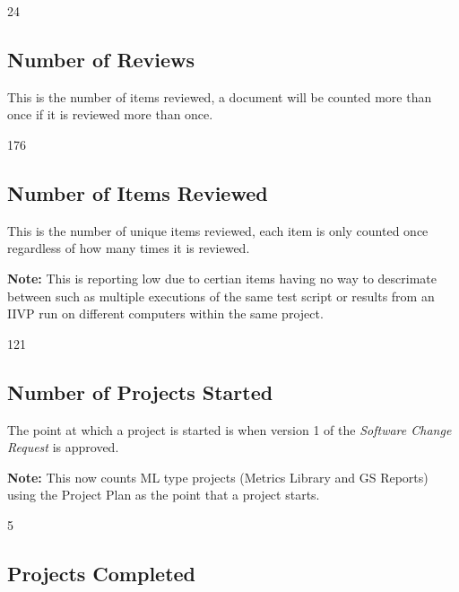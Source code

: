 \documentclass{article}
\begin{document}
\begin{Schunk}
\begin{Soutput}
[1] 24
\end{Soutput}
\end{Schunk}

\subsection{Number of Reviews}
This is the number of items reviewed, a document will be counted more than once
if it is reviewed more than once.

\begin{Schunk}
\begin{Soutput}
[1] 176
\end{Soutput}
\end{Schunk}

\subsection{Number of Items Reviewed}
This is the number of unique items reviewed, each item is only counted once
regardless of how many times it is reviewed.

\textbf{Note:} This is reporting low due to certian items having no way to
descrimate between such as multiple executions of the same test script or
results from an IIVP run on different computers within the same project.

\begin{Schunk}
\begin{Soutput}
[1] 121
\end{Soutput}
\end{Schunk}

\subsection{Number of Projects Started}
The point at which a project is started is when version 1 of the \textit{Software
Change Request} is approved.

\textbf{Note:} This now counts ML type projects (Metrics Library and GS Reports)
using the Project Plan as the point that a project starts.

\begin{Schunk}
\begin{Soutput}
[1] 5
\end{Soutput}
\end{Schunk}

\subsection{Projects Completed}
\end{document}
